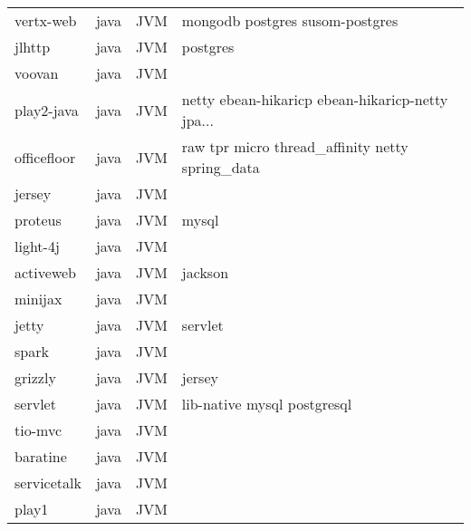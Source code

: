 \begin{longtable}{llll}
    vertx-web        & java        & JVM         & mongodb postgres susom-postgres                    \\
    jlhttp           & java        & JVM         & postgres                                           \\
    voovan           & java        & JVM         &                                                    \\
    play2-java       & java        & JVM         & netty ebean-hikaricp ebean-hikaricp-netty jpa...   \\
    officefloor      & java        & JVM         & raw tpr micro thread\_affinity netty spring\_data  \\
    jersey           & java        & JVM         &                                                    \\
    proteus          & java        & JVM         & mysql                                              \\
    light-4j         & java        & JVM         &                                                    \\
    activeweb        & java        & JVM         & jackson                                            \\
    minijax          & java        & JVM         &                                                    \\
    jetty            & java        & JVM         & servlet                                            \\
    spark            & java        & JVM         &                                                    \\
    grizzly          & java        & JVM         & jersey                                             \\
    servlet          & java        & JVM         & lib-native mysql postgresql                        \\
    tio-mvc          & java        & JVM         &                                                    \\
    baratine         & java        & JVM         &                                                    \\
    servicetalk      & java        & JVM         &                                                    \\
    play1            & java        & JVM         &                                                    \\

\end{longtable}
